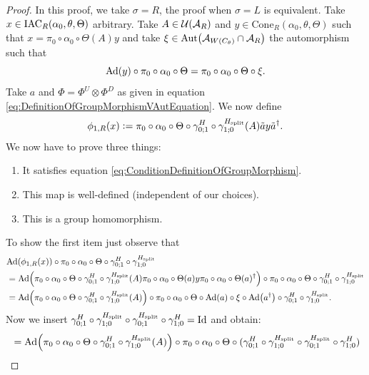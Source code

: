 \documentclass[11pt,a4paper,twoside]{article}
\numberwithin{equation}{section}
\begin{document}
	\begin{proof}
		In this proof, we take $\sigma=R$, the proof when $\sigma=L$ is equivalent. Take $x\in \textrm{IAC}_R(\alpha_0,\theta,\Theta)$ arbitrary. Take $A\in\mathcal U(\mathcal A_R)$ and $y\in\textrm{Cone}_R(\alpha_0,\theta,\Theta)$ such that $x=\pi_0\circ\alpha_0\circ\Theta(A)y$ and take $\xi\in\Aut{\AA_{W(C_\theta)}\cap \AA_R}$ the automorphism such that
		\begin{equation}
			\Ad{y}\circ\pi_0\circ\alpha_0\circ\Theta=\pi_0\circ\alpha_0\circ\Theta\circ\xi.
		\end{equation}
		Take $a$ and $\Phi=\Phi^U\otimes\Phi^D$ as given in equation \eqref{eq:DefinitionOfGroupMorphismVAutEquation}. We now define
		\begin{equation}
			\phi_{1,R}(x)\vcentcolon= \pi_0\circ\alpha_0\circ\Theta\circ\gamma^H_{0;1}\circ\gamma^{{H_{\text{split}}}}_{1;0}(A)\tilde{a}y\tilde{a}^\dagger.
		\end{equation}
		We now have to prove three things:
		\begin{enumerate}
			\item It satisfies equation \eqref{eq:ConditionDefinitionOfGroupMorphism}.
			\item This map is well-defined (independent of our choices).
			\item This is a group homomorphism.
		\end{enumerate}
		To show the first item just observe that
		\begin{align}
			\nonumber
			&\Ad{\phi_{1,R}(x)}\circ\pi_0\circ\alpha_0\circ\Theta\circ\gamma^H_{0;1}\circ\gamma^{\Hsplit}_{1;0}\\
			&=\Ad{\pi_0\circ\alpha_0\circ\Theta\circ\gamma^H_{0;1}\circ\gamma^{\Hsplit}_{1;0}(A)\pi_0\circ\alpha_0\circ\Theta(a)y\pi_0\circ\alpha_0\circ\Theta(a)^\dagger}\circ\pi_0\circ\alpha_0\circ\Theta\circ\gamma^H_{0;1}\circ\gamma^{\Hsplit}_{1;0}\\
			\nonumber
			&=\Ad{\pi_0\circ\alpha_0\circ\Theta\circ\gamma^H_{0;1}\circ\gamma^{\Hsplit}_{1;0}(A)}\circ\pi_0\circ\alpha_0\circ\Theta\circ\Ad{a}\circ\xi\circ\Ad{a^\dagger}\circ\gamma^H_{0;1}\circ\gamma^{\Hsplit}_{1;0}.
		\end{align}
		Now we insert $\gamma^H_{0;1}\circ\gamma^{{H_{\text{split}}}}_{1;0}\circ\gamma^{{H_{\text{split}}}}_{0;1}\circ\gamma^H_{1;0}=\text{Id}$ and obtain:
		\begin{align}
			&=\Ad{\pi_0\circ\alpha_0\circ\Theta\circ\gamma^H_{0;1}\circ\gamma^{\Hsplit}_{1;0}(A)}\circ\pi_0\circ\alpha_0\circ\Theta\circ(\gamma^H_{0;1}\circ\gamma^{\Hsplit}_{1;0}\circ\gamma^{\Hsplit}_{0;1}\circ\gamma^H_{1;0})\\

\end{align}
\end{proof}
\end{document}
